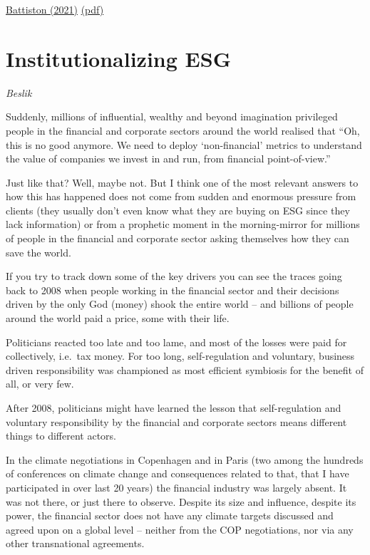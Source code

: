 \documentclass[
]{book}
\begin{document}
\href{https://www.science.org/doi/10.1126/science.aad0299}{Battiston (2021)}
\href{pdf/Battiston_2021_Complexity_Theory_and_Financial_Regulation.pdf}{(pdf)}

\hypertarget{institutionalizing-esg}{%
\section{Institutionalizing ESG}\label{institutionalizing-esg}}

\emph{Beslik}

Suddenly, millions of influential, wealthy and beyond imagination privileged people in the financial and corporate sectors around the world realised that ``Oh, this is no good anymore. We need to deploy `non-financial' metrics to understand the value of companies we invest in and run, from financial point-of-view.''

Just like that? Well, maybe not. But I think one of the most relevant answers to how this has happened does not come from sudden and enormous pressure from clients (they usually don't even know what they are buying on ESG since they lack information) or from a prophetic moment in the morning-mirror for millions of people in the financial and corporate sector asking themselves how they can save the world.

If you try to track down some of the key drivers you can see the traces going back to 2008 when people working in the financial sector and their decisions driven by the only God (money) shook the entire world -- and billions of people around the world paid a price, some with their life.

Politicians reacted too late and too lame, and most of the losses were paid for collectively, i.e.~tax money. For too long, self-regulation and voluntary, business driven responsibility was championed as most efficient symbiosis for the benefit of all, or very few.

After 2008, politicians might have learned the lesson that self-regulation and voluntary responsibility by the financial and corporate sectors means different things to different actors.

In the climate negotiations in Copenhagen and in Paris (two among the hundreds of conferences on climate change and consequences related to that, that I have participated in over last 20 years) the financial industry was largely absent. It was not there, or just there to observe. Despite its size and influence, despite its power, the financial sector does not have any climate targets discussed and agreed upon on a global level -- neither from the COP negotiations, nor via any other transnational agreements.
\end{document}
